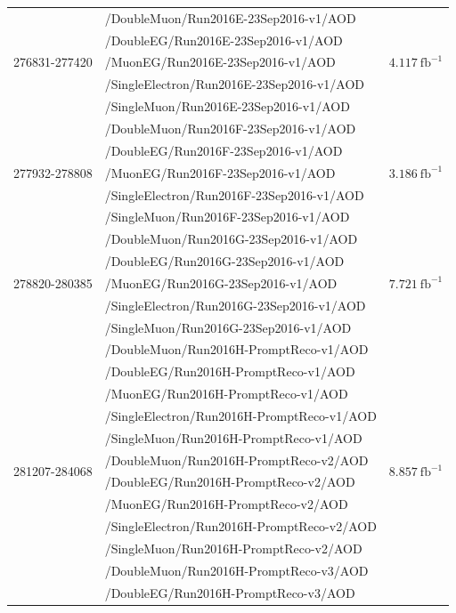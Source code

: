 \begin{table}[h]
\begin{tabular}{l|l|l}
\hline
\multirow{5}{*}{276831-277420} & /DoubleMuon/Run2016E-23Sep2016-v1/AOD &  \multirow{5}{*}{$4.117\ \text{fb}^{-1}$} \\ 
& /DoubleEG/Run2016E-23Sep2016-v1/AOD &  \\ 
& /MuonEG/Run2016E-23Sep2016-v1/AOD &  \\ 
& /SingleElectron/Run2016E-23Sep2016-v1/AOD &  \\ 
& /SingleMuon/Run2016E-23Sep2016-v1/AOD &  \\ 
\hline
\multirow{5}{*}{277932-278808} & /DoubleMuon/Run2016F-23Sep2016-v1/AOD &  \multirow{5}{*}{$3.186\ \text{fb}^{-1}$} \\ 
& /DoubleEG/Run2016F-23Sep2016-v1/AOD &  \\ 
& /MuonEG/Run2016F-23Sep2016-v1/AOD &  \\ 
& /SingleElectron/Run2016F-23Sep2016-v1/AOD &  \\ 
& /SingleMuon/Run2016F-23Sep2016-v1/AOD &  \\ 
\hline
\multirow{5}{*}{278820-280385} & /DoubleMuon/Run2016G-23Sep2016-v1/AOD &  \multirow{5}{*}{$7.721\ \text{fb}^{-1}$} \\ 
& /DoubleEG/Run2016G-23Sep2016-v1/AOD &  \\ 
& /MuonEG/Run2016G-23Sep2016-v1/AOD &  \\ 
& /SingleElectron/Run2016G-23Sep2016-v1/AOD &  \\ 
& /SingleMuon/Run2016G-23Sep2016-v1/AOD &  \\ 
\hline
\multirow{15}{*}{281207-284068} & /DoubleMuon/Run2016H-PromptReco-v1/AOD &  \multirow{15}{*}{$8.857\ \text{fb}^{-1}$} \\ 
& /DoubleEG/Run2016H-PromptReco-v1/AOD &  \\ 
& /MuonEG/Run2016H-PromptReco-v1/AOD &  \\ 
& /SingleElectron/Run2016H-PromptReco-v1/AOD &  \\ 
& /SingleMuon/Run2016H-PromptReco-v1/AOD &  \\ 
& /DoubleMuon/Run2016H-PromptReco-v2/AOD &  \\ 
& /DoubleEG/Run2016H-PromptReco-v2/AOD &  \\ 
& /MuonEG/Run2016H-PromptReco-v2/AOD &  \\ 
& /SingleElectron/Run2016H-PromptReco-v2/AOD &  \\ 
& /SingleMuon/Run2016H-PromptReco-v2/AOD &  \\ 
& /DoubleMuon/Run2016H-PromptReco-v3/AOD &  \\ 
& /DoubleEG/Run2016H-PromptReco-v3/AOD &  \\ 

\end{tabular}
\end{table}
